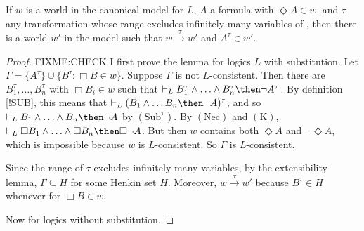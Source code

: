 \documentclass[11pt]{woarticle}
\newcommand{\cmnt}[1]{\iffalse #1 \fi}
\theoremstyle{break}
\theoremstyle{nonumberplain}
\newcommand{\1}{\;\,|\;\,}
\newcommand{\var}{\emph{Var}}
\newcommand{\fvar}{\emph{Varf}}
\newcommand{\T}[1]{\ensuremath{(\mathrm{ #1})}}
\begin{document}
\begin{lemma}\label{existence}
  If $w$ is a world in the canonical model for $L$, $A$ a formula with
  $\Diamond A \in w$, and $\tau$ any transformation whose range
  excludes infinitely many variables of , then there is a world
  $w'$ in the model such that $w\xrightarrow{\tau}w'$ and $A^{\tau}
  \in w'$.
\end{lemma}

\begin{proof}
  FIXME:CHECK
  I first prove the lemma for logics $L$ with substitution. Let
  $\Gamma = \{ A^\tau \} \cup \{ B^\tau : \Box B \in w \}$.%
  \cmnt{%
    E.g., $\Gamma$ might be $\{ \exists x Fx \} \cup \{ Fx : x \in
    \var(\Fr{L}^*)$.%
  } %
  Suppose $\Gamma$ is not $L$-consistent. Then there are $B_1^\tau,
  \ldots, B_n^\tau$ with $\Box B_i \in w$ such that $\vdash_{L}
  B_1^\tau \land \ldots\land B_n^\tau \then \neg A^\tau$. By
  definition \ref{!SUB}, this means that $\vdash_L (B_1 \land \ldots
  B_n \then \neg A)^\tau$, and so $\vdash_L B_1\land\ldots\land B_n
  \then \neg A$ by \T{Sub^\tau}. By \T{Nec} and \T{K}, $\vdash_{L}
  \Box B_1 \land \ldots \land \Box B_n \then \Box \neg A$. But then
  $w$ contains both $\Diamond A$ and $\neg \Diamond A$, which is
  impossible because $w$ is $L$-consistent. So $\Gamma$ is
  $L$-consistent.

  Since the range of $\tau$ excludes infinitely many variables, by the
  extensibility lemma, $\Gamma \subseteq H$ for some Henkin set $H$.
  Moreover, $w\xrightarrow{\tau}w'$ because $B^\tau\in H$ whenever for
  $\Box B \in w$.

  Now for logics without substitution.

  \cmnt{ 

    We can't use the same simple construction as before, since the
    world $w'$ must satisfy the more sophisticated definition of
    accessibility. Recall that for substitution-free logics,
    $w\xrightarrow{\tau}w'$ iff for every formula $A$ and variables
    $x_1\ldots x_n$, $y_1,\ldots,y_n$ ($n \geq 0$) such that the
    $x_1\ldots x_n$ are pairwise distinct members of $\fvar(A)$, if
    $x_1\!=\!y_1 \land \ldots \land x_n\!=\!y_n \land \Box A\in w$ and
    $y_1^\tau \!=\!y_1^\tau \land\ldots\land y_n^\tau\!=\!y_n^\tau \in
    w'$, then there are variables $z_1\ldots z_n \not\in \var(A^\tau)$
    such that $z_1\!=\!y_1^\tau \land \ldots \land z_n\!=\!y_n^\tau
    \land [z_1\ldots z_n/x_1^\tau\ldots x_n^\tau] A^\tau \in w'$.

    (Consider again the case where $w$ contains $x\!=\!y \land
    \Box\Diamond x\!\not=\!y$. Assuming positive models, this says
    that every counterpart of the individual denoted by $x$ and $y$
    has multiple counterparts at some further world. If $w'$ is
    $\tau$-accessible from $w$, we therefore want $[y^\tau]_{w'}$ to
    have multiple counterparts at some world $w''$. Hence we require
    that if $w$ contains $x\!=\!y \land \Box \Diamond x\!\not=\!y$,
    then there is a $z$ such that $w'$ contains $y^\tau\!=\!z \land
    \Diamond z\!\not=\!y^\tau$.)

}
\end{proof}
\end{document}
